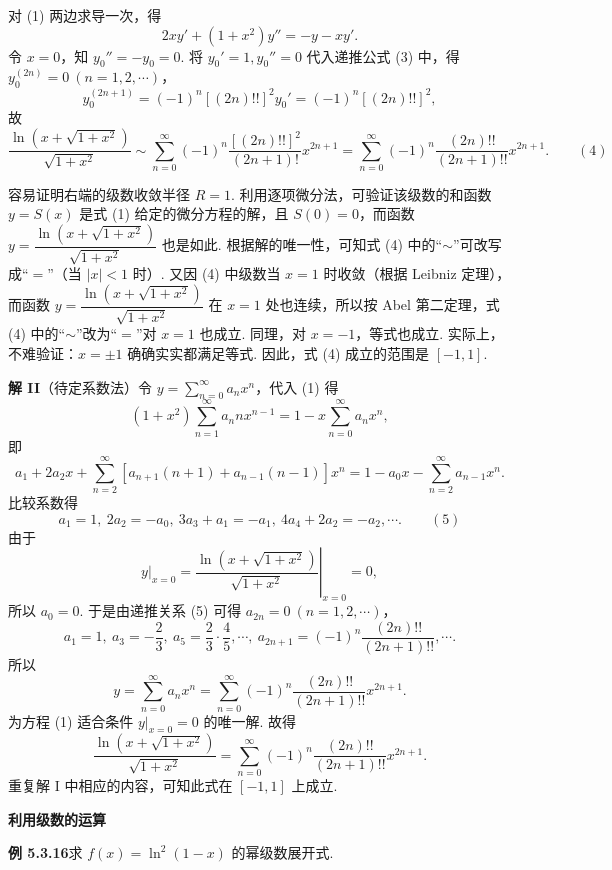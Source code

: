 \documentclass[UTF8, 12pt, fontset=fandol, oneside]{ctexart}
\begin{document}
对 (1) 两边求导一次，得
\[
  2xy'+(1+x^2)y''=-y-xy'.
\]
令 $x=0$，知 $y_0''=-y_0=0$. 将 $y_0'=1,y_0''=0$ 代入递推公式 (3) 中，得
$y_0^{(2n)}=0\ (n=1,2,\cdots)$，
\[
  y_0^{(2n+1)}=(-1)^n[(2n)!!]^2y_0'=(-1)^n[(2n)!!]^2,
\]
故
\[
  \frac{\ln(x+\sqrt{1+x^2})}{\sqrt{1+x^2}}
  \sim\sum_{n=0}^{\infty}(-1)^n\frac{[(2n)!!]^2}{(2n+1)!}x^{2n+1}
  =\sum_{n=0}^{\infty}(-1)^n\frac{(2n)!!}{(2n+1)!!}x^{2n+1}. \qquad(4)
\]

容易证明右端的级数收敛半径 $R=1$. 利用逐项微分法，可验证该级数的和函数 $y=S(x)$ 是式 (1) 给定的微分方程的解，且 $S(0)=0$，而函数
$y=\dfrac{\ln(x+\sqrt{1+x^2})}{\sqrt{1+x^2}}$ 也是如此. 根据解的唯一性，可知式 (4) 中的“$\sim$”可改写成“$=$”（当 $|x|<1$ 时）. 又因 (4) 中级数当 $x=1$ 时收敛（根据 Leibniz 定理），而函数
$y=\dfrac{\ln(x+\sqrt{1+x^2})}{\sqrt{1+x^2}}$ 在 $x=1$ 处也连续，所以按 Abel 第二定理，式 (4) 中的“$\sim$”改为“$=$”对 $x=1$ 也成立. 同理，对 $x=-1$，等式也成立. 实际上，不难验证：$x=\pm1$ 确确实实都满足等式. 因此，式 (4) 成立的范围是 $[-1,1]$.

\noindent\textbf{解 II}\quad （待定系数法）令
$y=\displaystyle\sum_{n=0}^{\infty}a_nx^n$，代入 (1) 得
\[
  (1+x^2)\sum_{n=1}^{\infty}a_nnx^{n-1}
  =1-x\sum_{n=0}^{\infty}a_nx^n,
\]
即
\[
  a_1+2a_2x+\sum_{n=2}^{\infty}[a_{n+1}(n+1)+a_{n-1}(n-1)]x^n
  =1-a_0x-\sum_{n=2}^{\infty}a_{n-1}x^n.
\]
比较系数得
\[
  a_1=1,\ 2a_2=-a_0,\ 3a_3+a_1=-a_1,\ 4a_4+2a_2=-a_2,\cdots. \qquad(5)
\]
由于
\[
  y\big|_{x=0}
  =\left.\frac{\ln(x+\sqrt{1+x^2})}{\sqrt{1+x^2}}\right|_{x=0}=0,
\]
所以 $a_0=0$. 于是由递推关系 (5) 可得 $a_{2n}=0\ (n=1,2,\cdots)$，
\[
  a_1=1,\ a_3=-\frac23,\ a_5=\frac23\cdot\frac45,\cdots,\ 
  a_{2n+1}=(-1)^n\frac{(2n)!!}{(2n+1)!!},\cdots.
\]
所以
\[
  y=\sum_{n=0}^{\infty}a_nx^n
  =\sum_{n=0}^{\infty}(-1)^n\frac{(2n)!!}{(2n+1)!!}x^{2n+1}.
\]
为方程 (1) 适合条件 $y|_{x=0}=0$ 的唯一解. 故得
\[
  \frac{\ln(x+\sqrt{1+x^2})}{\sqrt{1+x^2}}
  =\sum_{n=0}^{\infty}(-1)^n\frac{(2n)!!}{(2n+1)!!}x^{2n+1}.
\]
重复解 I 中相应的内容，可知此式在 $[-1,1]$ 上成立.

\noindent\textbf{利用级数的运算}

\noindent\textbf{例 5.3.16}\quad 求 $f(x)=\ln^2(1-x)$ 的幂级数展开式.
\end{document}
